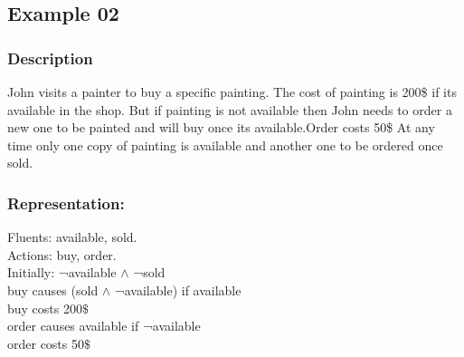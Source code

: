 \documentclass[11pt]{article}
\begin{document}
	\subsection{Example 02}\label{example:ex02}
	\subsubsection{Description}\label{par:p102}
	John visits a painter to buy a specific painting. The cost of painting is 200\$ if its available in the shop. But if painting is not available then John needs to order a new one to be painted and will buy once its available.Order costs 50\$ At any time only one copy of painting is available and another one to be ordered once sold. 
	
	\subsubsection{Representation:}\label{par:p202}
	\indent 
	Fluents: available, sold.\\
	Actions: buy, order.\\
	Initially: ¬available $\wedge$  ¬sold\\
	buy causes (sold $\land$ ¬available) if available\\
	buy costs 200$\$$ \\
	order causes available if ¬available\\
	order costs 50$\$$ \\
	
\end{document}
